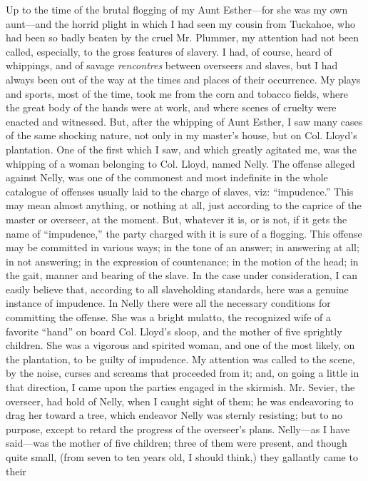 Up to the time of the brutal flogging of my Aunt Esther---for she was my
own aunt---and the horrid plight in which I had seen my cousin from
Tuckahoe, who had been so badly beaten by the cruel Mr. Plummer, my
attention had not been called, especially, to the gross features of
slavery. I had, of course, heard of whippings, and of savage
\emph{rencontres} between overseers and slaves, but I had always been
out of the way at the times and places of their occurrence. My plays and
sports, most of the time, took me from the corn and tobacco fields,
where the great body of the hands were at work, and where scenes of
cruelty were {}enacted and witnessed. But, after the whipping of Aunt
Esther, I saw many cases of the same shocking nature, not only in my
master's house, but on Col. Lloyd's plantation. One of the first which I
saw, and which greatly agitated me, was the whipping of a woman
belonging to Col. Lloyd, named Nelly. The offense alleged against Nelly,
was one of the commonest and most indefinite in the whole catalogue of
offenses usually laid to the charge of slaves, viz: ``impudence.'' This
may mean almost anything, or nothing at all, just according to the
caprice of the master or overseer, at the moment. But, whatever it is,
or is not, if it gets the name of ``impudence,'' the party charged with
it is sure of a flogging. This offense may be committed in various ways;
in the tone of an answer; in answering at all; in not answering; in the
expression of countenance; in the motion of the head; in the gait,
manner and bearing of the slave. In the case under consideration, I can
easily believe that, according to all slaveholding standards, here was a
genuine instance of impudence. In Nelly there were all the necessary
conditions for committing the offense. She was a bright mulatto, the
recognized wife of a favorite ``hand'' on board Col. Lloyd's sloop, and
the mother of five sprightly children. She was a vigorous and spirited
woman, and one of the most likely, on the plantation, to be guilty of
impudence. My attention was called to the scene, by the noise, curses
and screams that proceeded from it; and, on going a little in that
direction, I came upon the parties engaged in the skirmish. Mr. Sevier,
the overseer, had hold of Nelly, when I caught sight of them; he {}was
endeavoring to drag her toward a tree, which endeavor Nelly was sternly
resisting; but to no purpose, except to retard the progress of the
overseer's plans. Nelly---as I have said---was the mother of five
children; three of them were present, and though quite small, (from
seven to ten years old, I should think,) they gallantly came to their

